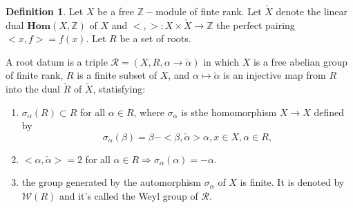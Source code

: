 \documentclass[12pt,a4paper,english]{article}
\theoremstyle{plain}
\theoremstyle{definition}
\newtheorem{defi}[thm]{Definition}
\begin{document}
\begin{defi}
Let $X$ be a free $\mathbb{Z}-$module of finte rank. Let $\check{X}$ denote the linear dual $\textbf{Hom}(X,\mathbb{Z})$ of $X$ and $<,>:X\times\check{X}\rightarrow\mathbb{Z}$ the perfect pairing $<x, f>=f(x)$. Let $R$ be a set of roots.

A root datum is a triple $\mathcal{R}=(X,R,\alpha\rightarrow\check{\alpha})$ in which $X$ is a free abelian group of finite rank, $R$ is a finite subset of $X$, and $\alpha\mapsto\check{\alpha}$ is an injective map from $R$ into the dual $\check{R}$ of $\check{X}$, statisfying:
\begin{enumerate}

    \item $\sigma_{\alpha}(R)\subset R$ for all $\alpha\in R$, where $\sigma_{\alpha}$ is sthe homomorphism $X\rightarrow X$ defined by 
    \begin{equation*}
        \sigma_{\alpha}(\beta)=\beta-<\beta,\check{\alpha}>\alpha,x\in X,\alpha\in R,
    \end{equation*}
        \item $<\alpha,\check{\alpha}>=2$ for all $\alpha\in R\Rightarrow \sigma_{\alpha}(\alpha)=-\alpha$.
    \item the group generated by the automorphism $\sigma_{\alpha}$ of $X$ is finite. It is denoted by $\mathcal{W}(R)$ and it's called the Weyl group of $\mathcal{R}$.
\end{enumerate}
\end{defi}
\end{document}
